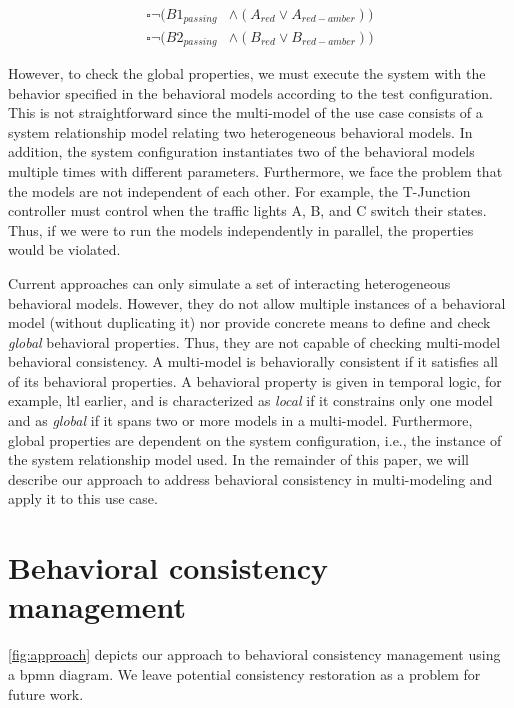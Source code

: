 \documentclass{jot}
\begin{document}
\begin{align}
    \square\neg(B1_{passing} & \land (A_{red} \lor A_{red-amber})) \label{eq:property3} \\
    \square\neg(B2_{passing} & \land (B_{red} \lor B_{red-amber})) \label{eq:property4}
\end{align}

However, to check the global properties, we must execute the system with the behavior specified in the behavioral models according to the test configuration.
This is not straightforward since the multi-model of the use case consists of a system relationship model relating two heterogeneous behavioral models.
In addition, the system configuration instantiates two of the behavioral models multiple times with different parameters.
Furthermore, we face the problem that the models are not independent of each other.
For example, the T-Junction controller must control when the traffic lights A, B, and C switch their states.
Thus, if we were to run the models independently in parallel, the properties would be violated.

Current approaches can only simulate a set of interacting heterogeneous behavioral models.
However, they do not allow multiple instances of a behavioral model (without duplicating it) nor provide concrete means to define and check \emph{global} behavioral properties.
Thus, they are not capable of checking multi-model behavioral consistency.
A multi-model is behaviorally consistent if it satisfies all of its behavioral properties.
A behavioral property is given in temporal logic, for example, \gls*{ltl} earlier, and is characterized as \emph{local} if it constrains only one model and as \emph{global} if it spans two or more models in a multi-model.
Furthermore, global properties are dependent on the system configuration, i.e., the instance of the system relationship model used.
In the remainder of this paper, we will describe our approach to address behavioral consistency in multi-modeling and apply it to this use case.

\section{Behavioral consistency management} \label{sec:behavioral_consistency_checking}
\autoref{fig:approach} depicts our approach to behavioral consistency management using a \gls*{bpmn} diagram.
We leave potential consistency restoration as a problem for future work.
\end{document}
